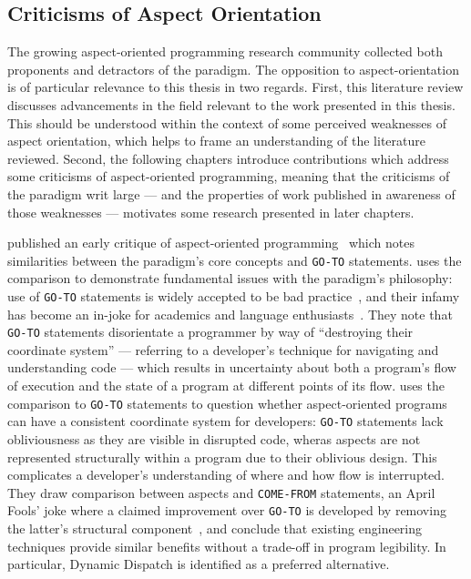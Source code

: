 \subsection{Criticisms of Aspect Orientation}\label{subsec:aop-criticisms}

The growing aspect-oriented programming research community collected both
proponents and detractors of the paradigm. The opposition to
aspect-orientation is of particular relevance to this thesis in two regards. First, this literature review discusses advancements in the field relevant to
the work presented in this thesis. This should be understood within the context
of some perceived weaknesses of aspect orientation, which helps to frame an
understanding of the literature reviewed. Second, the following chapters
introduce contributions which address some criticisms of aspect-oriented
programming, meaning that the criticisms of the paradigm writ large --- and the
properties of work published in awareness of those weaknesses --- motivates some
research presented in later chapters.


\citeauthor{Constantinides04aopconsidered} published an early critique of
aspect-oriented programming~\cite{Constantinides04aopconsidered} which notes
similarities between the paradigm's core concepts and \lstinline{GO-TO}
statements. \citeauthor{Constantinides04aopconsidered} uses the comparison to
demonstrate fundamental issues with the paradigm's philosophy: use of
\lstinline{GO-TO} statements is widely accepted to be bad
practice~\cite{dijkstra1968letters}, and their infamy has become an in-joke for
academics and language enthusiasts~\cite{clark73comefrom}. They note that
\lstinline{GO-TO} statements disorientate a programmer by way of ``destroying
their coordinate system'' --- referring to a developer's technique for
navigating and understanding code --- which results in uncertainty about both a
program's flow of execution and the state of a program at different points of
its flow. \citeauthor{Constantinides04aopconsidered} uses the comparison to
\lstinline{GO-TO} statements to question whether aspect-oriented programs can
have a consistent coordinate system for developers: \lstinline{GO-TO} statements
lack obliviousness as they are visible in disrupted code, wheras aspects are not
represented structurally within a program due to their oblivious design. This
complicates a developer's understanding of where and how flow is interrupted.
They draw comparison between aspects and \lstinline{COME-FROM} statements, an
April Fools' joke where a claimed improvement over \lstinline{GO-TO} is
developed by removing the latter's structural component~\cite{clark73comefrom},
and conclude that existing engineering techniques provide similar benefits
without a trade-off in program legibility. In particular, Dynamic Dispatch is
identified as a preferred alternative.


